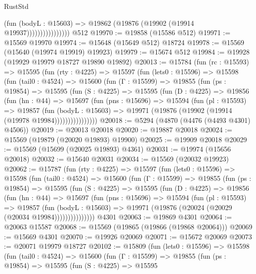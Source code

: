\begin{lexlean}{RustStd}
\begin{coremodule}
                            (fun (bodyL : @15603) =>
                            @19862 (@19876 (@19902 (@19914 @19937))))))))))))))))
    @512
@19970 := @19858 (@15586 @512)
@19971 := @15569 @19970
@19974 := @15648 (@15649 @512) @18724
@19978 := @15569 (@15640 (@19974 @19919) @19923)
@19979 := @15674 @512
@19984 := @19928 (@19929 @19979 @18727 @19890 @19892)
@20013 := @15784
    (fun (rc : @15593) =>
    @15595
      (fun (rty : @4225) =>
      @15597
        (fun (lets0 : @15596) =>
        @15598
          (fun (tail0 : @4524) =>
          @15600
            (fun (Γ : @15599) =>
            @19855
              (fun (ps : @19854) =>
              @15595
                (fun (S : @4225) =>
                @15595
                  (fun (D : @4225) =>
                  @19856
                    (fun (hn : @44) =>
                    @15697
                      (fun (pns : @15696) =>
                      @15594
                        (fun (pl : @15593) =>
                        @19857
                          (fun (bodyL : @15603) =>
                          @19971 (@19876 (@19902 (@19914 (@19978 @19984))))))))))))))))
@20018 := @5294 (@4870 (@4476 (@4493 @4301) @4506))
@20019 := @20013 @20018
@20020 := @19887 @20018
@20024 := @15569 (@19879 (@20020 @19893) @19900)
@20025 := @19909 @20018
@20029 := @15569 (@15699 (@20025 @19893) @4361)
@20031 := @19974 (@15656 @20018)
@20032 := @15640 @20031
@20034 := @15569 (@20032 @19923)
@20062 := @15787
    (fun (rty : @4225) =>
    @15597
      (fun (lets0 : @15596) =>
      @15598
        (fun (tail0 : @4524) =>
        @15600
          (fun (Γ : @15599) =>
          @19855
            (fun (ps : @19854) =>
            @15595
              (fun (S : @4225) =>
              @15595
                (fun (D : @4225) =>
                @19856
                  (fun (hn : @44) =>
                  @15697
                    (fun (pns : @15696) =>
                    @15594
                      (fun (pl : @15593) =>
                      @19857
                        (fun (bodyL : @15603) =>
                        @19971 (@19876 (@20024 (@20029 (@20034 @19984)))))))))))))))
    @4301
@20063 := @19869 @4301
@20064 := @20063 @15587
@20068 := @15569 (@19865 (@19866 (@19868 @20064)))
@20069 := @15669 @4301
@20070 := @19926 @20069
@20071 := @15672 @20069
@20073 := @20071 @19979 @18727
@20102 := @15809
    (fun (lets0 : @15596) =>
    @15598
      (fun (tail0 : @4524) =>
      @15600
        (fun (Γ : @15599) =>
        @19855
          (fun (ps : @19854) =>
          @15595
            (fun (S : @4225) =>
            @15595

\end{coremodule}
\end{lexlean}
